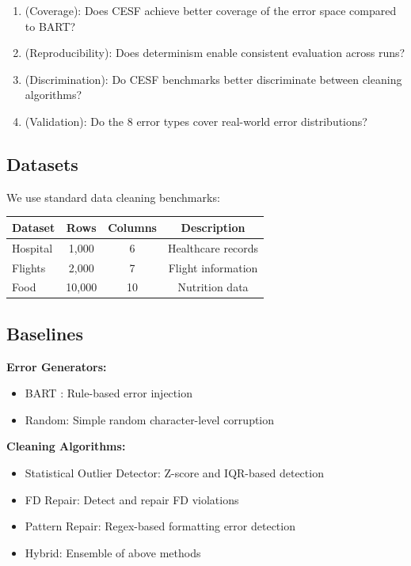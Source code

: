 \documentclass[11pt,a4paper]{article}
\begin{document}
\begin{enumerate}
    \item[RQ1] (Coverage): Does CESF achieve better coverage of the error space compared to BART?
    \item[RQ2] (Reproducibility): Does determinism enable consistent evaluation across runs?
    \item[RQ3] (Discrimination): Do CESF benchmarks better discriminate between cleaning algorithms?
    \item[RQ4] (Validation): Do the 8 error types cover real-world error distributions?
\end{enumerate}

\subsection{Datasets}

We use standard data cleaning benchmarks:

\begin{table}[h]
\centering
\begin{tabular}{lccc}
\toprule
Dataset & Rows & Columns & Description \\
\midrule
Hospital & 1,000 & 6 & Healthcare records \\
Flights & 2,000 & 7 & Flight information \\
Food & 10,000 & 10 & Nutrition data \\
\bottomrule
\end{tabular}
\end{table}

\subsection{Baselines}

\textbf{Error Generators:}
\begin{itemize}
    \item BART \citep{arocena2015error}: Rule-based error injection
    \item Random: Simple random character-level corruption
\end{itemize}

\textbf{Cleaning Algorithms:}
\begin{itemize}
    \item Statistical Outlier Detector: Z-score and IQR-based detection
    \item FD Repair: Detect and repair FD violations
    \item Pattern Repair: Regex-based formatting error detection
    \item Hybrid: Ensemble of above methods
\end{itemize}
\end{document}
